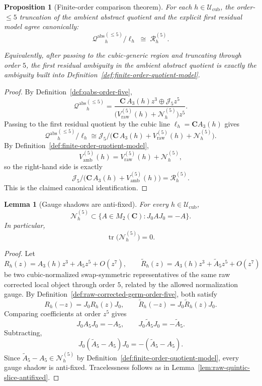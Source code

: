 \documentclass[11pt,a4paper]{amsart}
\theoremstyle{plain}
\newtheorem{proposition}[theorem]{Proposition}
\newtheorem{lemma}[theorem]{Lemma}
\theoremstyle{definition}
\newcommand{\Qabs}{\mathcal Q^{\mathrm{abs}}}
\begin{document}
\begin{proposition}[Finite-order comparison theorem]
\label{prop:finite-order-comparison-qabs}
For each $h\in \mathcal U_{\mathrm{cub}}$, the order-$\le 5$ truncation of
the ambient abstract quotient and the explicit first residual model agree
canonically:
\[
{\Qabs}_h^{(\le 5)}/\ell_h
\;\cong\;
\mathcal R_h^{(5)}.
\]

Equivalently, after passing to the cubic-generic region and truncating through
order $5$, the first residual ambiguity in the ambient abstract quotient is
exactly the ambiguity built into
Definition~\ref{def:finite-order-quotient-model}.
\end{proposition}

\begin{proof}
By Definition~\ref{def:qabs-order-five},
\[
{\Qabs}_h^{(\le 5)}
=
\frac{\mathbf C\,A_3(h)z^3\oplus \mathcal J_5 z^5}
{\bigl(V_{\mathrm{raw}}^{(5)}(h)+\mathcal N_h^{(5)}\bigr)z^5}.
\]
Passing to the first residual quotient by the cubic line
$\ell_h=\mathbf C A_3(h)$ gives
\[
{\Qabs}_h^{(\le 5)}/\ell_h
\cong
\mathcal J_5/
\bigl(\mathbf C\,A_3(h)+V_{\mathrm{raw}}^{(5)}(h)+\mathcal N_h^{(5)}\bigr).
\]
By Definition~\ref{def:finite-order-quotient-model},
\[
V_{\mathrm{amb}}^{(5)}(h)
=
V_{\mathrm{raw}}^{(5)}(h)+\mathcal N_h^{(5)},
\]
so the right-hand side is exactly
\[
\mathcal J_5/
\bigl(\mathbf C\,A_3(h)+V_{\mathrm{amb}}^{(5)}(h)\bigr)
=
\mathcal R_h^{(5)}.
\]
This is the claimed canonical identification.
\end{proof}

\begin{lemma}[Gauge shadows are anti-fixed]
\label{lem:gauge-shadows-antifixed}
For every $h\in\mathcal U_{\mathrm{cub}}$,
\[
\mathcal N_h^{(5)}\subset
\{A\in M_2(\mathbf C):J_0AJ_0=-A\}.
\]
In particular,
\[
\operatorname{tr}\bigl(\mathcal N_h^{(5)}\bigr)=0.
\]
\end{lemma}

\begin{proof}
Let
\[
R_h(z)=A_3(h)z^3+A_5 z^5+O(z^7),
\qquad
\widetilde R_h(z)=A_3(h)z^3+\widetilde A_5 z^5+O(z^7)
\]
be two cubic-normalized swap-symmetric representatives of the same raw
corrected local object through order $5$, related by the allowed
normalization gauge. By Definition~\ref{def:raw-corrected-germ-order-five},
both satisfy
\[
R_h(-z)=J_0R_h(z)J_0,
\qquad
\widetilde R_h(-z)=J_0\widetilde R_h(z)J_0.
\]
Comparing coefficients at order $z^5$ gives
\[
J_0A_5J_0=-A_5,
\qquad
J_0\widetilde A_5J_0=-\widetilde A_5.
\]
Subtracting,
\[
J_0(\widetilde A_5-A_5)J_0=-(\widetilde A_5-A_5).
\]
Since $\widetilde A_5-A_5\in \mathcal N_h^{(5)}$ by
Definition~\ref{def:finite-order-quotient-model}, every gauge shadow is
anti-fixed. Tracelessness follows as in
Lemma~\ref{lem:raw-quintic-slice-antifixed}.
\end{proof}
\end{document}
